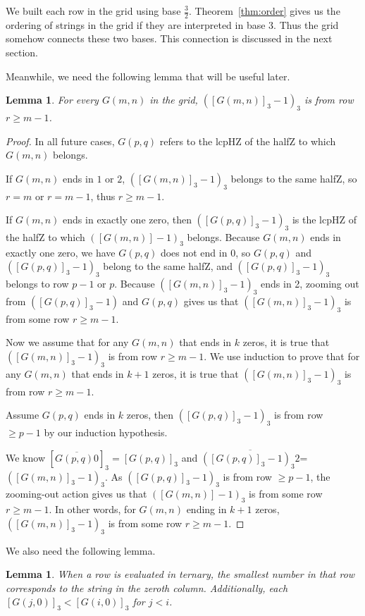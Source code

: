 \documentclass[12pt,reqno]{article}
\theoremstyle{plain}
\newtheorem{lemma}[theorem]{Lemma}
\theoremstyle{definition}
\theoremstyle{remark}
\begin{document}
We built each row in the grid using base $\frac{3}{2}$. Theorem~\ref{thm:order} gives us the ordering of strings in the grid if they are interpreted in base 3. Thus the grid somehow connects these two bases. This connection is discussed in the next section.

Meanwhile, we need the following lemma that will be useful later.

\begin{lemma}\label{lemma:minus1}
For every $G(m,n)$ in the grid, $([G(m,n)]_3-1)_3$  is from row $r \geq m-1$.
\end{lemma}
\begin{proof}
In all future cases, $G(p,q)$ refers to the lcpHZ of the halfZ to which $G(m,n)$ belongs.

If $G(m,n)$ ends in $1$ or $2$, $([G(m,n)]_3-1)_3$ belongs to the same halfZ, so $r=m$ or $r = m-1$, thus $r \geq m-1$.

If $G(m,n)$ ends in exactly one zero, then $([G(p,q)]_3-1)_3$ is the lcpHZ of the halfZ to which $([G(m,n)]-1)_3$ belongs. Because $G(m,n)$ ends in exactly one zero, we have $G(p,q)$ does not end in $0$, so $G(p,q)$ and $([G(p,q)]_3-1)_3$ belong to the same halfZ, and $([G(p,q)]_3-1)_3$ belongs to row $p-1$ or $p$. Because $([G(m,n)]_3-1)_3$ ends in 2, zooming out from $([G(p,q)]_3-1)$ and $G(p,q)$ gives us that $([G(m,n)]_3-1)_3$ is from some row $r \geq m-1$.

Now we assume that for any $G(m,n)$ that ends in $k$ zeros, it is true that $([G(m,n)]_3-1)_3$ is from row $r \geq m-1$. We use induction to prove that for any $G(m,n)$ that ends in $k+1$ zeros, it is true that $([G(m,n)]_3-1)_3$ is from row $r \geq m-1$. 

Assume $G(p,q)$ ends in $k$ zeros, then $([G(p,q)]_3-1)_3$ is from row $\geq p-1$ by our induction hypothesis.

We know $[\overline{G(p,q)0}]_3 = [G(p,q)]_3$ and $\overline{([G(p,q)]_3-1)_{3} 2}$= $([G(m,n)]_3-1)_3$. As $([G(p,q)]_3-1)_3$ is from row $\geq p-1$, the zooming-out action gives us that $([G(m,n)]-1)_3$ is from some row $r \geq m-1$. In other words, for $G(m,n)$ ending in $k+1$ zeros, $([G(m,n)]_3-1)_3$ is from some row $r \geq m-1$.
\end{proof}

We also need the following lemma.

\begin{lemma}\label{lemma:zerocolumn}
When a row is evaluated in ternary, the smallest number in that row corresponds to the string in the zeroth column. Additionally, each $[G(j,0)]_3<[G(i,0)]_3$ for $j<i$.
\end{lemma}
\end{document}
